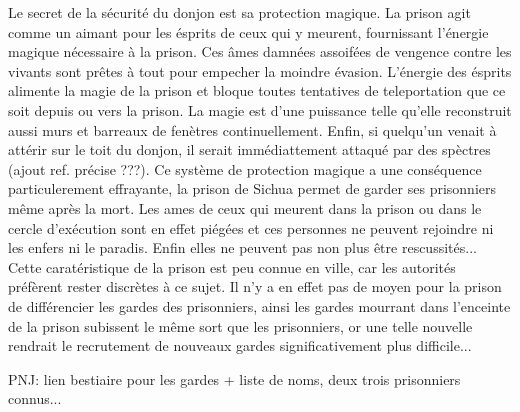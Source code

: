 Le secret de la sécurité du donjon est sa protection magique. La prison
agit comme un aimant pour les ésprits de ceux qui y meurent, fournissant
l'énergie magique nécessaire à la prison. Ces âmes damnées assoifées de vengence
contre les vivants sont prêtes à tout 
pour empecher la moindre évasion. L'énergie des ésprits alimente la magie de 
la prison et bloque toutes 
tentatives de teleportation que ce soit depuis ou vers la prison. La magie est d'une
puissance telle qu'elle reconstruit aussi murs et barreaux de fenètres
continuellement. Enfin, si quelqu'un venait à attérir sur le toit du donjon, il 
serait immédiattement attaqué par des spèctres (ajout ref. précise ???).
Ce système de protection magique a une conséquence particulerement effrayante,
la prison de Sichua permet de garder ses prisonniers même après la mort.
Les ames de
ceux qui meurent dans la prison ou dans le cercle d'exécution sont en effet piégées et
ces personnes ne peuvent rejoindre ni les enfers ni le paradis. Enfin elles ne
peuvent pas non plus être rescussités... Cette caratéristique de la prison est peu connue
en ville, car les autorités préfèrent rester discrètes à ce sujet. Il n'y a
en effet pas de moyen pour la prison de différencier les
gardes des prisonniers, ainsi les gardes mourrant dans l'enceinte de la prison
subissent le même sort que les prisonniers, or une telle nouvelle rendrait le 
recrutement de nouveaux gardes significativement plus difficile...


PNJ: lien bestiaire pour les 
gardes + liste de noms, deux trois prisonniers connus...


